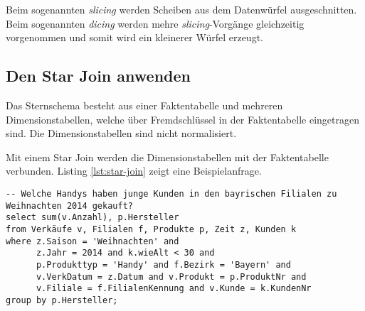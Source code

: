 Beim sogenannten \emph{slicing} werden Scheiben aus dem Datenwürfel ausgeschnitten. Beim sogenannten \emph{dicing} werden mehre \emph{slicing}-Vorgänge gleichzeitig vorgenommen und somit wird ein kleinerer Würfel erzeugt.

\newpage

\subsection{Den Star Join anwenden}

Das Sternschema besteht aus einer Faktentabelle und mehreren Dimensionstabellen, welche über Fremdschlüssel in der Faktentabelle eingetragen sind. Die Dimensionstabellen sind nicht normalisiert.

Mit einem Star Join werden die Dimensionstabellen mit der Faktentabelle verbunden. Listing \ref{lst:star-join} zeigt eine Beispielanfrage.

\begin{lstlisting}[caption={Star Join},label=lst:star-join]
-- Welche Handys haben junge Kunden in den bayrischen Filialen zu Weihnachten 2014 gekauft?
select sum(v.Anzahl), p.Hersteller
from Verkäufe v, Filialen f, Produkte p, Zeit z, Kunden k
where z.Saison = 'Weihnachten' and
	  z.Jahr = 2014 and k.wieAlt < 30 and
	  p.Produkttyp = 'Handy' and f.Bezirk = 'Bayern' and
	  v.VerkDatum = z.Datum and v.Produkt = p.ProduktNr and
	  v.Filiale = f.FilialenKennung and v.Kunde = k.KundenNr
group by p.Hersteller;
\end{lstlisting}